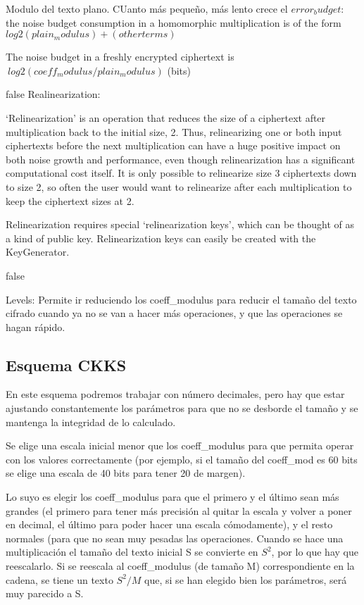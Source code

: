 Modulo del texto plano. CUanto más pequeño, más lento crece el $error_budget$: the noise budget consumption in a homomorphic multiplication is of the form $log2(plain_modulus) + (other terms)$

The noise budget in a freshly encrypted ciphertext is $~ log2(coeff_modulus/plain_modulus)$  (bits)


\if false
Realinearization:

`Relinearization' is an operation that reduces the size of a ciphertext after
    multiplication back to the initial size, 2. Thus, relinearizing one or both
    input ciphertexts before the next multiplication can have a huge positive
    impact on both noise growth and performance, even though relinearization has
    a significant computational cost itself. It is only possible to relinearize
    size 3 ciphertexts down to size 2, so often the user would want to relinearize
    after each multiplication to keep the ciphertext sizes at 2.

    Relinearization requires special `relinearization keys', which can be thought
    of as a kind of public key. Relinearization keys can easily be created with
    the KeyGenerator.

\fi

\if false

Levels: Permite ir reduciendo los coeff\_modulus para reducir el tamaño del texto cifrado cuando ya no se van a hacer más operaciones, y que las operaciones se hagan rápido.

\fi

\subsection{Esquema CKKS}

En este esquema podremos trabajar con número decimales, pero hay que estar ajustando constantemente los parámetros para que no se desborde el tamaño y se mantenga la integridad de lo calculado.

Se elige una escala inicial menor que los coeff\_modulus para que permita operar con los valores correctamente (por ejemplo, si el tamaño del coeff\_mod es 60 bits se elige una escala de 40 bits para tener 20 de margen).

Lo suyo es elegir los coeff\_modulus para que el primero y el último sean más grandes (el primero para tener más precisión al quitar la escala y volver a poner en decimal, el último para poder hacer una escala cómodamente), y el resto normales (para que no sean muy pesadas las operaciones. Cuando se hace una multiplicación el tamaño del texto inicial S se convierte en $S^2$, por lo que hay que reescalarlo. Si se reescala al coeff\_modulus (de tamaño M) correspondiente en la cadena, se tiene un texto $S^2/M$ que, si se han elegido bien los parámetros, será muy parecido a S.

